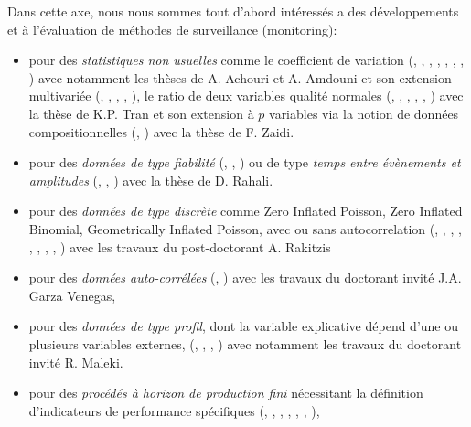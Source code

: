 Dans cette axe, nous nous sommes tout d'abord intéressés a des
développements et à l'évaluation de méthodes de surveillance
(monitoring):
\begin{itemize}
\item pour des \emph{statistiques non usuelles} comme le coefficient
  de variation (\cite{yeong:hal-01716541},
  \cite{amdouni:hal-01573597}, \cite{you:hal-01351488},
  \cite{teoh:hal-01381673}, \cite{amdouni:hal-01388503},
  \cite{castagliola:hal-01083082}, \cite{castagliola:hal-01202423},
  \cite{amdouni:hal-01202424}) avec notamment les thèses de A. Achouri
  et A. Amdouni et son extension multivariée
  (\cite{khatun:hal-02072237}, \cite{nguyen:hal-01885435},
  \cite{ginerbosch:hal-02283481}, \cite{khaw:hal-01895172},
  \cite{yeong:hal-01307037}), le ratio de deux variables qualité
  normales (\cite{tran:hal-01773342}, \cite{celano:hal-01264243},
  \cite{celano:hal-01272650}, \cite{tran:hal-01308072},
  \cite{tran:hal-01345854}, \cite{tran:hal-01396009}) avec la thèse de
  K.P. Tran et son extension à $p$ variables via la notion de données
  compositionnelles (\cite{zaidi:hal-02273060},
  \cite{tran:hal-01731361}) avec la thèse de F. Zaidi.
\item pour des \emph{données de type fiabilité}
  (\cite{haghighi:hal-02183425}, \cite{castagliola:hal-01204508},
  \cite{haghighi:hal-01264248}) ou de type \emph{temps entre
    évènements et amplitudes} (\cite{rahali:hal-02135093},
  \cite{qu:hal-01809531}, \cite{qu:hal-01895010}) avec la thèse de
  D. Rahali.
\item pour des \emph{données de type discrète} comme Zero Inflated
  Poisson, Zero Inflated Binomial, Geometrically Inflated Poisson,
  avec ou sans autocorrelation (\cite{rakitzis:hal-01718089},
  \cite{rakitzis:hal-01466793}, \cite{rakitzis:hal-01659129},
  \cite{bersimis:hal-01676808}, \cite{rakitzis:hal-01231367},
  \cite{rakitzis:hal-01331381}, \cite{rakitzis:hal-01345886},
  \cite{rakitzis:hal-01345887}, \cite{rakitzis:hal-01166916}) avec les
  travaux du post-doctorant A. Rakitzis
\item pour des \emph{données auto-corrélées}
  (\cite{garzavenegas:hal-01824643}, \cite{franco:hal-01169579}) avec
  les travaux du doctorant invité J.A. Garza Venegas,
\item pour des \emph{données de type profil}, dont la variable
  explicative dépend d'une ou plusieurs variables externes,
  (\cite{maleki:hal-02183432}, \cite{maleki:hal-01870773},
  \cite{maleki:hal-01905445}, \cite{guevara:hal-01580777}) avec
  notamment les travaux du doctorant invité R. Maleki.
\item pour des \emph{procédés à horizon de production fini}
  nécessitant la définition d'indicateurs de performance spécifiques
  (\cite{chong:hal-01978750}, \cite{celano:hal-01921379},
  \cite{celano:hal-01921386}, \cite{nenes:hal-01425549},
  \cite{celano:hal-01313577}, \cite{celano:hal-01367280},
  \cite{celano:hal-01382239}),
\end{itemize}

